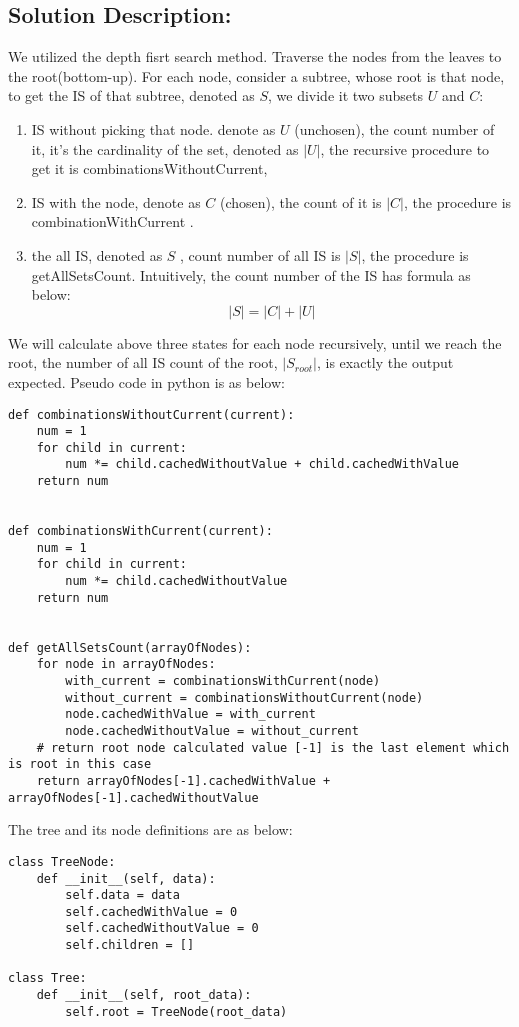 \documentclass{article}
\begin{document}
\subsection*{Solution Description:}
We utilized the depth fisrt search method. Traverse the nodes from the leaves to the root(bottom-up).
For each node, consider a subtree, whose root is that node, to get the IS of that subtree, denoted as $S$, we divide it two subsets $U$ and $C$: 
\begin{enumerate}
  \item IS without picking that node. denote as $U$ (unchosen), the count number of it, it's the cardinality of the set, denoted as $|U|$, the recursive procedure to get it is combinationsWithoutCurrent,  
  \item IS with the node, denote as $C$ (chosen), the count of it is $|C|$, the procedure is combinationWithCurrent . 
  \item the all IS,  denoted as $S$ , count number of all IS is $|S|$, the procedure is getAllSetsCount.
  Intuitively, the count number of the IS has formula as below:
    \[ |S| = |C| + |U| \] 
\end{enumerate}
We will calculate above three states for each node recursively, until we reach the root, the number of all IS count of the root,
$|S_{root}|$, is exactly the output expected. Pseudo code in python is as below: 
\begin{lstlisting}
def combinationsWithoutCurrent(current):
    num = 1
    for child in current:
        num *= child.cachedWithoutValue + child.cachedWithValue
    return num


def combinationsWithCurrent(current):
    num = 1
    for child in current:
        num *= child.cachedWithoutValue
    return num


def getAllSetsCount(arrayOfNodes):
    for node in arrayOfNodes:
        with_current = combinationsWithCurrent(node)
        without_current = combinationsWithoutCurrent(node)
        node.cachedWithValue = with_current
        node.cachedWithoutValue = without_current
    # return root node calculated value [-1] is the last element which is root in this case
    return arrayOfNodes[-1].cachedWithValue + arrayOfNodes[-1].cachedWithoutValue
\end{lstlisting}

The tree and its node definitions are as below:

\begin{lstlisting}
class TreeNode:
    def __init__(self, data):
        self.data = data
        self.cachedWithValue = 0
        self.cachedWithoutValue = 0
        self.children = []

class Tree:
    def __init__(self, root_data):
        self.root = TreeNode(root_data)
\end{lstlisting}
\end{document}
